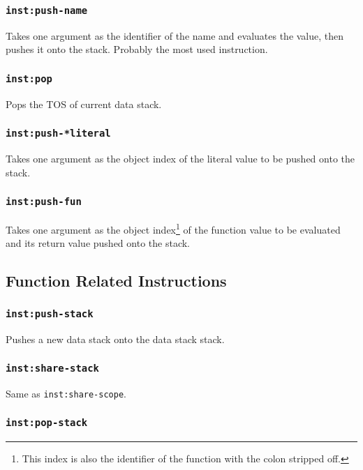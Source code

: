 \documentclass{article}
\newcommand{\inst}[1] {\texttt{inst:#1}}
\begin{document}
\subsubsection{\inst{push-name}}

Takes one argument as the identifier of the name and evaluates the value, then pushes it onto the stack. Probably the most used instruction.

\subsubsection{\inst{pop}}

Pops the TOS of current data stack.

\subsubsection{\inst{push-*literal}}

Takes one argument as the object index of the literal value to be pushed onto the stack.

\subsubsection{\inst{push-fun}}

Takes one argument as the object index\footnote{This index is also the identifier of the function with the colon stripped off.} of the function value to be evaluated and its return value pushed onto the stack.

\subsection{Function Related Instructions}

\subsubsection{\inst{push-stack}}

Pushes a new data stack onto the data stack stack.

\subsubsection{\inst{share-stack}}

Same as \inst{share-scope}.

\subsubsection{\inst{pop-stack}}
\end{document}
